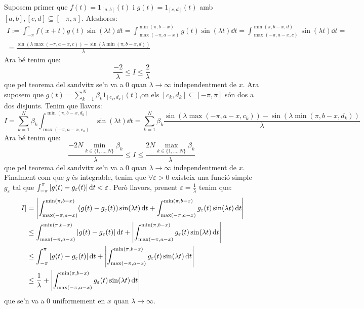 \documentclass[10pt,a4paper]{article}
\newcommand{\vf}[1]{\boldsymbol{\mathrm{#1}}} %
\theoremstyle{definition}
\begin{document}
\begin{enumerate}
        Suposem primer que $f(t)=\vf{1}_{[a,b]}(t)$ i $g(t)=\vf{1}_{[c,d]}(t)$ amb $[a,b],[c,d]\subseteq[-\pi,\pi]$. Aleshores:
        \begin{multline*}
          I:=\int_{-\pi}^{\pi}f(x+t)g(t)\sin(\lambda t)\dd{t}=\int_{\max(-\pi,a-x)}^{\min(\pi,b-x)}g(t)\sin(\lambda t)\dd{t}=\int_{\max(-\pi,a-x,c)}^{\min(\pi,b-x,d)}\sin(\lambda t)\dd{t}=\\
          =\frac{\sin(\lambda \max(-\pi,a-x,c))-\sin(\lambda \min(\pi,b-x,d))}{\lambda}
        \end{multline*}
        Ara bé tenim que:
        $$ \frac{-2}{\lambda}\leq I\leq \frac{2}{\lambda}$$
        que pel teorema del sandvitx se'n va a 0 quan $\lambda\to\infty$ independentment de $x$. Ara suposem que $g(t)=\sum_{k=1}^N\beta_k\vf{1}_{[c_k,d_k]}(t)$,on els $[c_k,d_k]\subseteq[-\pi,\pi]$ són dos a dos disjunts. Tenim que llavors:
        $$I=\sum_{k=1}^N\beta_k\int_{\max(-\pi,a-x,c_k)}^{\min(\pi,b-x,d_k)}\sin(\lambda t)\dd{t}=\sum_{k=1}^N\beta_k\frac{\sin(\lambda \max(-\pi,a-x,c_k))-\sin(\lambda \min(\pi,b-x,d_k))}{\lambda}$$
        Ara bé tenim que:
        $$ \frac{-2N\min_{k\in\{1,\ldots,N\}}\beta_k}{\lambda}\leq I\leq \frac{2N\max_{k\in\{1,\ldots,N\}}\beta_k}{\lambda}$$
        que pel teorema del sandvitx se'n va a 0 quan $\lambda\to\infty$ independentment de $x$. Finalment com que $g$ és integrable, tenim que $\forall\varepsilon>0$ existeix una funció simple $g_\varepsilon$ tal que $\int_{-\pi}^{\pi}\abs{g(t)-g_\varepsilon(t)}\dd{t}<\varepsilon$.
        Però llavors, prenent $\varepsilon=\frac{1}{\lambda}$ tenim que:
        \begin{align*}
          \abs{I} & =\abs{\int_{\max(-\pi,a-x)}^{\min(\pi,b-x)}(g(t)-g_\varepsilon(t))\sin(\lambda t)\dd{t}+\int_{\max(-\pi,a-x)}^{\min(\pi,b-x)}g_\varepsilon(t)\sin(\lambda t)\dd{t}} \\
                  & \leq\int_{\max(-\pi,a-x)}^{\min(\pi,b-x)}\abs{g(t)-g_\varepsilon(t)}\dd{t}+\abs{\int_{\max(-\pi,a-x)}^{\min(\pi,b-x)}g_\varepsilon(t)\sin(\lambda t)\dd{t}}         \\
                  & \leq\int_{-\pi}^{\pi}\abs{g(t)-g_\varepsilon(t)}\dd{t}+\abs{\int_{\max(-\pi,a-x)}^{\min(\pi,b-x)}g_\varepsilon(t)\sin(\lambda t)\dd{t}}                             \\
                  & \leq\frac{1}{\lambda}+\abs{\int_{\max(-\pi,a-x)}^{\min(\pi,b-x)}g_\varepsilon(t)\sin(\lambda t)\dd{t}}
        \end{align*}
        que se'n va a 0 uniformement en $x$ quan $\lambda\to\infty$.


\end{enumerate}
\end{document}
